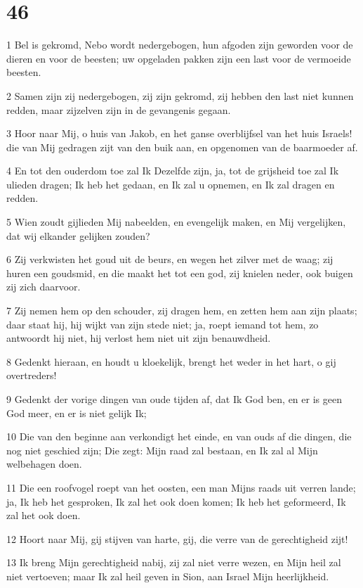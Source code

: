 \chapter{46}

\par 1 Bel is gekromd, Nebo wordt nedergebogen, hun afgoden zijn geworden voor de dieren en voor de beesten; uw opgeladen pakken zijn een last voor de vermoeide beesten.
\par 2 Samen zijn zij nedergebogen, zij zijn gekromd, zij hebben den last niet kunnen redden, maar zijzelven zijn in de gevangenis gegaan.
\par 3 Hoor naar Mij, o huis van Jakob, en het ganse overblijfsel van het huis Israels! die van Mij gedragen zijt van den buik aan, en opgenomen van de baarmoeder af.
\par 4 En tot den ouderdom toe zal Ik Dezelfde zijn, ja, tot de grijsheid toe zal Ik ulieden dragen; Ik heb het gedaan, en Ik zal u opnemen, en Ik zal dragen en redden.
\par 5 Wien zoudt gijlieden Mij nabeelden, en evengelijk maken, en Mij vergelijken, dat wij elkander gelijken zouden?
\par 6 Zij verkwisten het goud uit de beurs, en wegen het zilver met de waag; zij huren een goudsmid, en die maakt het tot een god, zij knielen neder, ook buigen zij zich daarvoor.
\par 7 Zij nemen hem op den schouder, zij dragen hem, en zetten hem aan zijn plaats; daar staat hij, hij wijkt van zijn stede niet; ja, roept iemand tot hem, zo antwoordt hij niet, hij verlost hem niet uit zijn benauwdheid.
\par 8 Gedenkt hieraan, en houdt u kloekelijk, brengt het weder in het hart, o gij overtreders!
\par 9 Gedenkt der vorige dingen van oude tijden af, dat Ik God ben, en er is geen God meer, en er is niet gelijk Ik;
\par 10 Die van den beginne aan verkondigt het einde, en van ouds af die dingen, die nog niet geschied zijn; Die zegt: Mijn raad zal bestaan, en Ik zal al Mijn welbehagen doen.
\par 11 Die een roofvogel roept van het oosten, een man Mijns raads uit verren lande; ja, Ik heb het gesproken, Ik zal het ook doen komen; Ik heb het geformeerd, Ik zal het ook doen.
\par 12 Hoort naar Mij, gij stijven van harte, gij, die verre van de gerechtigheid zijt!
\par 13 Ik breng Mijn gerechtigheid nabij, zij zal niet verre wezen, en Mijn heil zal niet vertoeven; maar Ik zal heil geven in Sion, aan Israel Mijn heerlijkheid.

